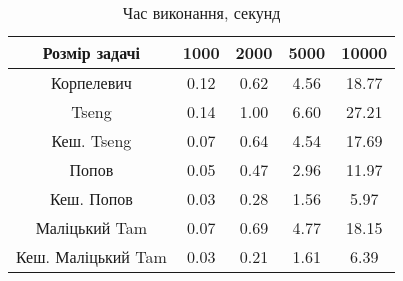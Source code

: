 \begin{table}[H]
	\centering
	\begin{tabular}{|c||c|c|c|c|}\hline
		Розмір задачі & 1000 & 2000 & 5000 & 10000 \\ \hline \hline
		Корпелевич & 0.12 & 0.62 & 4.56 & 18.77 \\ \hline
		Tseng & 0.14 & 1.00 & 6.60 & 27.21 \\ \hline
		Кеш. Tseng & 0.07 & 0.64 & 4.54 & 17.69 \\ \hline
		Попов & 0.05 & 0.47 & 2.96 & 11.97 \\ \hline
		Кеш. Попов & 0.03 & 0.28 & 1.56 & 5.97 \\ \hline
		Маліцький Tam & 0.07 & 0.69 & 4.77 & 18.15 \\ \hline
		Кеш. Маліцький Tam & 0.03 & 0.21 & 1.61 & 6.39 \\ \hline
	\end{tabular}
	\caption{Час виконання, секунд}
\end{table}
